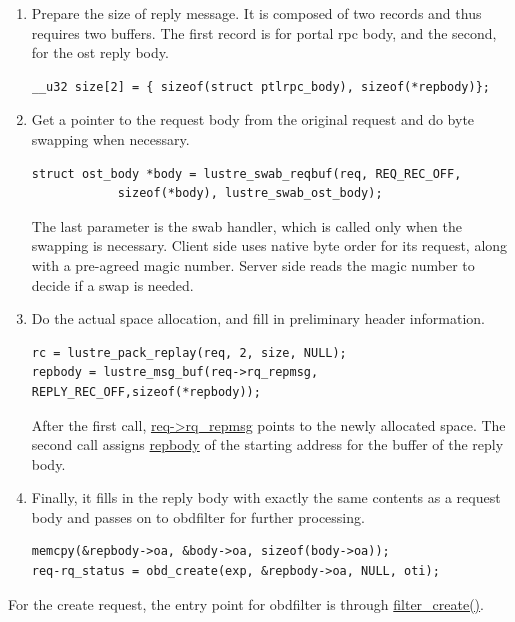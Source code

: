 \begin{enumerate}

\item Prepare the size of reply message. It is composed of two records and thus
requires two buffers. The first record is for portal rpc body, and the second,
for the ost reply body.

\begin{Verbatim}
__u32 size[2] = { sizeof(struct ptlrpc_body), sizeof(*repbody)};
\end{Verbatim}

\item Get a pointer to the request body from the original request and do
byte swapping when necessary.

\begin{Verbatim}
struct ost_body *body = lustre_swab_reqbuf(req, REQ_REC_OFF,
            sizeof(*body), lustre_swab_ost_body);
\end{Verbatim}

The last parameter is the swab handler, which is called only when the swapping is
necessary. Client side uses native byte order for its request, along with a
pre-agreed magic number. Server side reads the magic number to decide if a swap
is needed.

\item Do the actual space allocation, and fill in preliminary header
information.

\begin{Verbatim}
rc = lustre_pack_replay(req, 2, size, NULL);
repbody = lustre_msg_buf(req->rq_repmsg, REPLY_REC_OFF,sizeof(*repbody));
\end{Verbatim}

After the first call, \url{req->rq_repmsg} points to the newly allocated
space. The second call assigns \url{repbody} of the starting address for the buffer
of the reply body.

\item Finally, it fills in the reply body with exactly the same contents as a
request body and passes on to obdfilter for further processing.

\begin{Verbatim}
memcpy(&repbody->oa, &body->oa, sizeof(body->oa));
req-rq_status = obd_create(exp, &repbody->oa, NULL, oti);
\end{Verbatim}

\end{enumerate}

For the create request, the entry point for obdfilter is through
\url{filter_create()}. 

